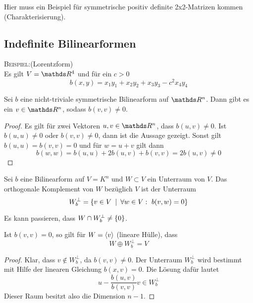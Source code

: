			Hier muss ein Beispiel für symmetrische positiv definite 2x2-Matrizen kommen (Charakterisierung).
			


		\subsection{Indefinite Bilinearformen} %
		\label{sub:indefinite_bilinearformen}
		
			\textsc{Beispiel:}\quad (Lorentzform)\\
			Es gilt $V = \SR^4$ und für ein $c>0$
			\[ b(x,y) = x_1y_1 + x_2y_2 + x_3y_3 - c^2x_4y_4 \]

			\begin{lemma}
				Sei $b$ eine nicht-triviale symmetrische Bilinearform auf $\SR^n$.
				Dann gibt es ein $v\in\SR^n$, sodass $b(v,v)\neq 0$.

			\end{lemma}
			\begin{proof}
				Es gilt für zwei Vektoren $u,v\in\SR^n$, dass $b(u,v)\neq 0$.
				Ist $b(u,u)\neq 0$ oder $b(v,v)\neq 0$, dann ist die Aussage gezeigt.
				Sonst gilt $b(u,u)=b(v,v)=0$ und für $w=u+v$ gilt dann
				\[ b(w,w) = b(u,u) + 2b(u,v) + b(v,v) = 2b(u,v) \neq 0 \]
			\end{proof} 

			\begin{definition}
				Sei $b$ eine Bilinearform auf $V=K^n$ und $W\subset V$ ein Unterraum von $V$.
				Das orthogonale Komplement von $W$ bezüglich $V$ ist der Unterraum
				\[ W_b^\perp = \left\{ v\in V \enspace \middle\vert \enspace \forall w\in V:\ b(v,w) = 0 \right\} \]
			\end{definition}

			Es kann passieren, dass $W\cap W^\perp_b \neq \left\{ 0 \right\}$.

			\begin{lemma}
				Ist $b(v,v)=0$, so gilt für $W = \left\langle v \right\rangle$ (lineare Hülle), dass
				\[ W \oplus W^\perp_b = V \]

			\end{lemma}
			\begin{proof}
				Klar, dass $v\notin W_b^\perp$, da $b(v,v)\neq 0$.
				Der Unterraum $W_b^\perp$ wird bestimmt mit Hilfe der linearen Gleichung $b(x,v)=0$.
				Die Lösung dafür lautet
				\[ u-\frac{b(u,v)}{b(v,v)}v \in W_b^\perp \]
				Dieser Raum besitzt also die Dimension $n-1$.
			\end{proof}

